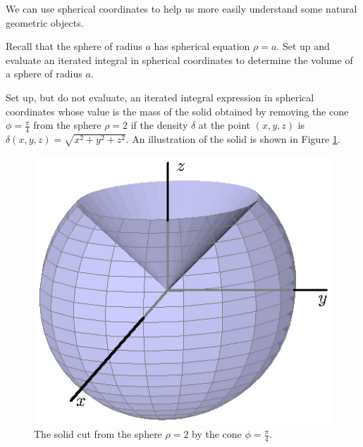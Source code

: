 \begin{activity} \label{A:11.8.10}  We can use spherical coordinates to help us more easily understand some natural geometric objects.
    \ba
    \item Recall that the sphere of radius $a$ has spherical equation $\rho = a$.  Set up and evaluate an iterated integral in spherical coordinates to determine the volume of a sphere of radius $a$. 
    
    \item Set up, but do not evaluate, an iterated integral expression in spherical coordinates whose value is the mass of the solid obtained by removing the cone $\phi=\frac{\pi}{4}$ from the sphere $\rho = 2$ if the density $\delta$ at the point $(x,y,z)$ is $\delta(x,y,z) = \sqrt{x^2+y^2+z^2}$.  An illustration of the solid is shown in Figure \ref{F:11.8.Spherical_ex2}.
\begin{figure}[ht]
\begin{center}
  \includegraphics{figures/fig_11_8_sphere_cone.eps}
\end{center}
\caption{The solid cut from the sphere $\rho = 2$ by the cone $\phi=\frac{\pi}{4}$.}
\label{F:11.8.Spherical_ex2}
\end{figure}
    \ea



\end{activity}
\begin{smallhint}

\end{smallhint}
\begin{bighint}

\end{bighint}
